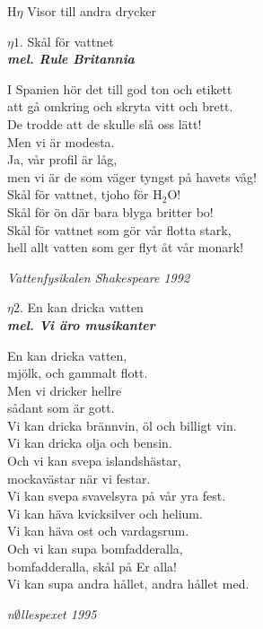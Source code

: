 \documentclass[a6paper,10pt]{article}
\newcommand{\mel}[1]{\small\textbf{\textit{mel. #1 \\}}}
\begin{document}
\noindent
\huge{H$\eta$ Visor till andra drycker}
\begin{center}
\Large $\eta1$. Skål för vattnet \\ 
\mel{Rule Britannia}
\end{center}
\small I Spanien hör det till god ton och etikett\\
att gå omkring och skryta vitt och brett.\\
De trodde att de skulle slå oss lätt!
\vspace{5pt}\\
Men vi är modesta.\\
Ja, vår profil är låg,\\
men vi är de som väger tyngst på havets våg!
\vspace{5pt}\\
Skål för vattnet, tjoho för H$_2$O!\\
Skål för ön där bara blyga britter bo!\\
Skål för vattnet som gör vår flotta stark,\\
hell allt vatten som ger flyt åt vår monark! 
\begin{flushright}
\textit{Vattenfysikalen Shakespeare 1992}
\end{flushright}

\setlength{\oddsidemargin}{-0.47in}
\noindent
\begin{center}
\Large $\eta2$.  En kan dricka vatten \\
\mel{Vi äro musikanter}
\end{center}
En kan dricka vatten, \\
mjölk, och gammalt flott.\\
Men vi dricker hellre\\
sådant som är gott.
\vspace{5pt}\\
Vi kan dricka brännvin, öl och billigt vin.\\
Vi kan dricka olja och bensin.
\vspace{5pt}\\
Och vi kan svepa islandshästar,\\
mockavästar när vi festar.\\
Vi kan svepa svavelsyra på vår yra fest.
\vspace{5pt}\\
Vi kan häva kvicksilver och helium.\\
Vi kan häva ost och vardagsrum.
\vspace{5pt}\\
Och vi kan supa bomfadderalla,\\
bomfadderalla, skål på Er alla!\\
Vi kan supa andra hållet, andra hållet med. 
\begin{flushright}
\textit{n$\emptyset$llespexet 1995}
\end{flushright}
\end{document}
